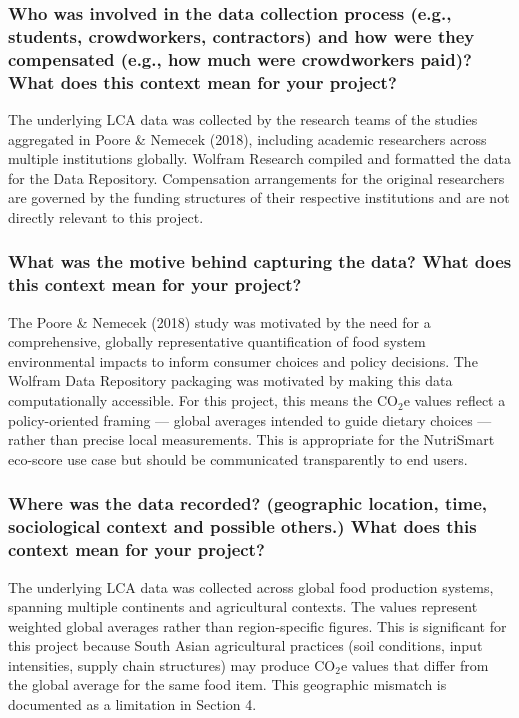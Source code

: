 \documentclass{article}
\newcommand{\question}[1]{#1}
\begin{document}
\question{\subsubsection*{Who was involved in the data collection process (e.g., students, crowdworkers, contractors) and how were they compensated (e.g., how much were crowdworkers paid)? What does this context mean for your project?}}

The underlying LCA data was collected by the research teams of the studies aggregated in Poore \& Nemecek (2018), including academic researchers across multiple institutions globally. Wolfram Research compiled and formatted the data for the Data Repository. Compensation arrangements for the original researchers are governed by the funding structures of their respective institutions and are not directly relevant to this project.

\question{\subsubsection*{What was the motive behind capturing the data? What does this context mean for your project?}}

The Poore \& Nemecek (2018) study was motivated by the need for a comprehensive, globally representative quantification of food system environmental impacts to inform consumer choices and policy decisions. The Wolfram Data Repository packaging was motivated by making this data computationally accessible. For this project, this means the CO$_2$e values reflect a policy-oriented framing --- global averages intended to guide dietary choices --- rather than precise local measurements. This is appropriate for the NutriSmart eco-score use case but should be communicated transparently to end users.

\question{\subsubsection*{Where was the data recorded? (geographic location, time, sociological context and possible others.) What does this context mean for your project?}}

The underlying LCA data was collected across global food production systems, spanning multiple continents and agricultural contexts. The values represent weighted global averages rather than region-specific figures. This is significant for this project because South Asian agricultural practices (soil conditions, input intensities, supply chain structures) may produce CO$_2$e values that differ from the global average for the same food item. This geographic mismatch is documented as a limitation in Section 4.
\end{document}
